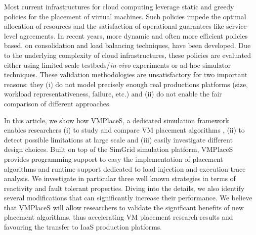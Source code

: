 Most current infrastructures for cloud computing leverage static and
greedy policies for the placement of virtual machines. Such policies
impede the optimal allocation of resources and the satisfaction of
operational guarantees like service-level agreements. In recent years,
more dynamic and often more efficient policies based, \eg on
consolidation and load balancing techniques, have been developed. Due
to the underlying complexity of cloud infrastructures, these policies
are evaluated either using limited scale testbeds/\emph{in-vivo}
experiments or ad-hoc simulator techniques. These validation
methodologies are unsatisfactory for two important reasons: they (i)
do not model precisely enough real productions platforms (size,
workload representativeness, failure, etc.) and (ii) do not enable the
fair comparison of different approaches.


In this article, we show how VMPlaceS, a dedicated simulation
framework enables researchers (i) to study and compare VM placement
algorithms , (ii) to detect possible limitations at large scale and
(iii) easily investigate different design choices. Built on top of the
SimGrid simulation platform, VMPlaceS provides programming support to
easy the implementation of placement algorithms and runtime support
dedicated to load injection and execution trace analysis. We
investigate in particular three well known strategies in terms of
reactivity and fault tolerant properties. Diving into the details, we
also identify several modifications that can significantly increase
their performance. We believe that VMPlaceS will allow researchers to
validate the significant benefits of new placement algorithms, thus
accelerating VM placement research results and favouring the transfer
to IaaS production platforms.

